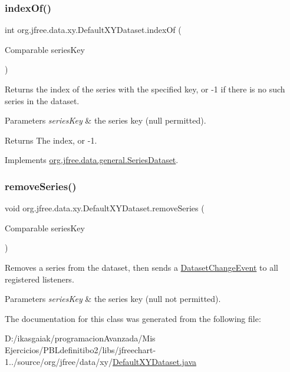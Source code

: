 \subsubsection{\texorpdfstring{index\+Of()}{indexOf()}}
{\footnotesize\ttfamily int org.\+jfree.\+data.\+xy.\+Default\+X\+Y\+Dataset.\+index\+Of (\begin{DoxyParamCaption}\item[{Comparable}]{series\+Key }\end{DoxyParamCaption})}

Returns the index of the series with the specified key, or -\/1 if there is no such series in the dataset.


\begin{DoxyParams}{Parameters}
{\em series\+Key} & the series key ({\ttfamily null} permitted).\\
\hline
\end{DoxyParams}
\begin{DoxyReturn}{Returns}
The index, or -\/1. 
\end{DoxyReturn}


Implements \mbox{\hyperlink{interfaceorg_1_1jfree_1_1data_1_1general_1_1_series_dataset_a8995ed4d70a6c4efe3a4f23318e47046}{org.\+jfree.\+data.\+general.\+Series\+Dataset}}.

\mbox{\label{classorg_1_1jfree_1_1data_1_1xy_1_1_default_x_y_dataset_a16d3b763b0b7eafc0dfb41d19dc684c2}} 
\subsubsection{\texorpdfstring{remove\+Series()}{removeSeries()}}
{\footnotesize\ttfamily void org.\+jfree.\+data.\+xy.\+Default\+X\+Y\+Dataset.\+remove\+Series (\begin{DoxyParamCaption}\item[{Comparable}]{series\+Key }\end{DoxyParamCaption})}

Removes a series from the dataset, then sends a \mbox{\hyperlink{}{Dataset\+Change\+Event}} to all registered listeners.


\begin{DoxyParams}{Parameters}
{\em series\+Key} & the series key ({\ttfamily null} not permitted). \\
\hline
\end{DoxyParams}


The documentation for this class was generated from the following file\+:\begin{DoxyCompactItemize}
\item 
D\+:/ikasgaiak/programacion\+Avanzada/\+Mis Ejercicios/\+P\+B\+Ldefinitibo2/libs/jfreechart-\/1../source/org/jfree/data/xy/\mbox{\hyperlink{_default_x_y_dataset_8java}{Default\+X\+Y\+Dataset.\+java}}\end{DoxyCompactItemize}
